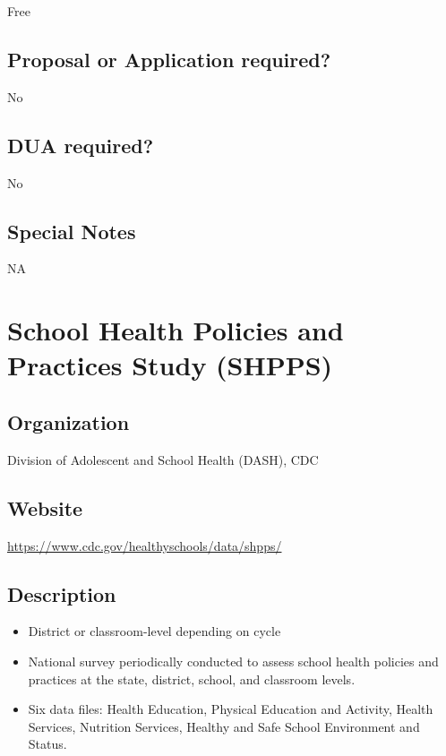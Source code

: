 \documentclass[
]{book}
\providecommand{\tightlist}{%
  \setlength{\itemsep}{0pt}\setlength{\parskip}{0pt}}
\begin{document}
Free

\hypertarget{proposal-or-application-required-75}{%
\section{Proposal or Application required?}\label{proposal-or-application-required-75}}

No

\hypertarget{dua-required-75}{%
\section{DUA required?}\label{dua-required-75}}

No

\hypertarget{special-notes-75}{%
\section{Special Notes}\label{special-notes-75}}

NA

\mainmatter

\hypertarget{school-health-policies-and-practices-study-shpps}{%
\chapter{School Health Policies and Practices Study (SHPPS)}\label{school-health-policies-and-practices-study-shpps}}

\hypertarget{organization-76}{%
\section{Organization}\label{organization-76}}

Division of Adolescent and School Health (DASH), CDC

\hypertarget{website-76}{%
\section{Website}\label{website-76}}

\url{https://www.cdc.gov/healthyschools/data/shpps/}

\hypertarget{description-76}{%
\section{Description}\label{description-76}}

\begin{itemize}
\tightlist
\item
  District or classroom-level depending on cycle
\item
  National survey periodically conducted to assess school health policies and practices at the state, district, school, and classroom levels.
\item
  Six data files: Health Education, Physical Education and Activity, Health Services, Nutrition Services, Healthy and Safe School Environment and Status.
\end{itemize}
\end{document}
